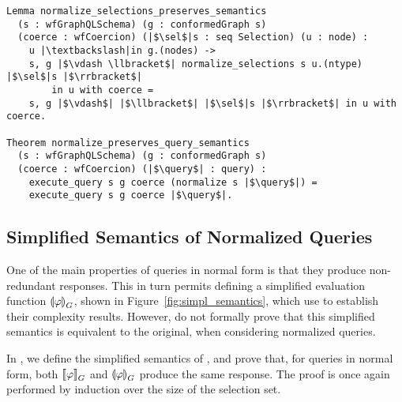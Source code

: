 \begin{verbatim}
Lemma normalize_selections_preserves_semantics
  (s : wfGraphQLSchema) (g : conformedGraph s) 
  (coerce : wfCoercion) (|$\sel$|s : seq Selection) (u : node) :
    u |\textbackslash|in g.(nodes) ->
    s, g |$\vdash \llbracket$| normalize_selections s u.(ntype) |$\sel$|s |$\rrbracket$|
        in u with coerce =
    s, g |$\vdash$| |$\llbracket$| |$\sel$|s |$\rrbracket$| in u with coerce. 
    
Theorem normalize_preserves_query_semantics 
  (s : wfGraphQLSchema) (g : conformedGraph s)
  (coerce : wfCoercion) (|$\query$| : query) :
    execute_query s g coerce (normalize s |$\query$|) =
    execute_query s g coerce |$\query$|.
\end{verbatim}


\subsection{Simplified Semantics of Normalized Queries}
\label{sec:simpl-semantics}

One of the main properties of queries in normal form is that they produce non-redundant responses.
This in turn permits defining a simplified evaluation function $\llparenthesis \varphi \rrparenthesis^{}_{G}$, shown in Figure~\ref{fig:simpl_semantics}, which \HP use to establish their complexity results.
However, \HP do not formally prove that this simplified semantics is equivalent to the original, when considering normalized queries.

In \gcoql, we define the simplified semantics of \HP, and prove that, for queries in normal form, both $\llbracket \varphi \rrbracket^{}_{G}$ and $\llparenthesis \varphi \rrparenthesis^{}_{G}$ produce the same response. 
%
The proof is once again performed by induction over the size of the selection set.

